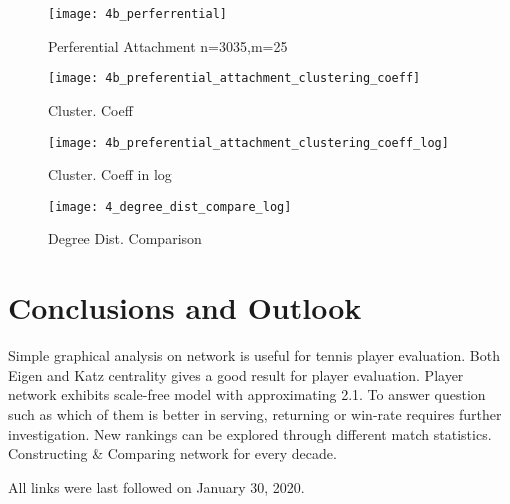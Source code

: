 \documentclass[runningheads]{llncs}
\begin{document}
\begin{figure}
\texttt{[image: 4b\_perferrential]}
\caption{Perferential Attachment n=3035,m=25} \label{fig_4b_perferrential}
\end{figure}

\begin{figure}
    \centering
    \begin{minipage}{0.5\textwidth}
        \centering
        \texttt{[image: 4b\_preferential\_attachment\_clustering\_coeff]} %
        \caption{Cluster. Coeff}
        \label{fig_4b_preferential_attachment_clustering_coeff}
    \end{minipage}\hfill
    \begin{minipage}{0.5\textwidth}
        \centering
        \texttt{[image: 4b\_preferential\_attachment\_clustering\_coeff\_log]} %
        \caption{ Cluster. Coeff in log}
        \label{fig_4b_preferential_attachment_clustering_coeff_log}
    \end{minipage}
\end{figure}


\begin{figure}
\centering
\texttt{[image: 4\_degree\_dist\_compare\_log]}
\caption{Degree Dist. Comparison} \label{fig_4b_degree_dist_compare_log}
\end{figure}


\section{Conclusions and Outlook}


Simple graphical analysis on network is useful for tennis player evaluation.
Both Eigen and Katz centrality gives a good result for player evaluation.
Player network exhibits scale-free model with \alpha approximating 2.1.
To answer question such as which of them is better in serving, returning or win-rate requires further investigation. New rankings can be explored through different match statistics. Constructing & Comparing network for every decade.

%
%



All links were last followed on January 30, 2020.
\end{document}
